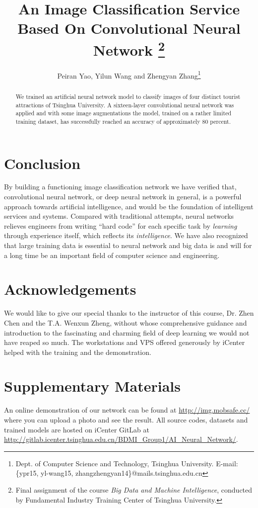 \documentclass[12pt, a4paper]{article}
\author{Peiran Yao, Yilun Wang and Zhengyan Zhang\thanks{Dept. of Computer Science and Technology, Tsinghua University. E-mail: \{ypr15, yl-wang15, zhangzhengyan14\}@mails.tsinghua.edu.cn}}
\title{An Image Classification Service Based On Convolutional Neural Network \thanks{Final assignment of the course \emph{Big Data and Machine Intelligence}, conducted by Fundamental Industry Training Center of Tsinghua University.}}
\date{}
\begin{document}
\maketitle
\begin{abstract}
    We trained an artificial neural network model to classify images of four distinct tourist attractions of Tsinghua University. A sixteen-layer convolutional neural network was applied and with some image augmentations the model, trained on a rather limited training dataset, has successfully reached an accuracy of approximately 80 percent.
\end{abstract}



\section{Conclusion}
By building a functioning image classification network we have verified that, convolutional neural network, or deep neural network in general, is a powerful approach towards artificial intelligence, and would be the foundation of intelligent services and systems. Compared with traditional attempts, neural networks relieves engineers from writing ``hard code'' for each specific task by \emph{learning} through experience itself, which reflects its \emph{intelligence}. We have also recognized that large training data is essential to neural network and big data is and will for a long time be an important field of computer science and engineering.
\section{Acknowledgements}
We would like to give our special thanks to the instructor of this course, Dr. Zhen Chen and the T.A. Wenxun Zheng, without whose comprehensive guidance and introduction to the fascinating and charming field of deep learning we would not have reaped so much. The workstations and VPS offered generously by iCenter helped with the training and the demonstration.
\section{Supplementary Materials}\label{sec:supplementary}
An online demonstration of our network can be found at \url{http://img.mobsafe.cc/} where you can upload a photo and see the result. All source codes, datasets and trained models are hosted on iCenter GitLab at \url{http://gitlab.icenter.tsinghua.edu.cn/BDMI_Group1/AI_Neural_Network/}.
{}
\end{document}
